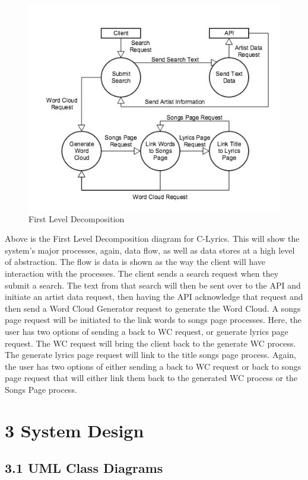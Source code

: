 \documentclass[]{article}
\begin{document}
\begin{figure}[htbp]
\centering
\includegraphics{first_level.jpg}
\caption{First Level Decomposition}
\end{figure}

Above is the First Level Decomposition diagram for C-Lyrics. This will show the system’s major processes, again, data flow, as well as data stores at a high level of abstraction. The flow is data is shown as the way the client will have interaction with the processes. The client sends a search request when they submit a search. The text from that search will then be sent over to the API and initiate an artist data request, then having the API acknowledge that request and then send a Word Cloud Generator request to generate the Word Cloud. A songs page request will be initiated to the link words to songs page processes. Here, the user has two options of sending a back to WC request, or generate lyrics page request. The WC request will bring the client back to the generate WC process. The generate lyrics page request will link to the title songs page process. Again, the user has two options of either sending a back to WC request or back to songs page request that will either link them back to the generated WC process or the Songs Page process.


\section{3 System Design}\label{system-design}

\subsection{3.1 UML Class Diagrams}\label{uml-class-diagrams}
\end{document}
